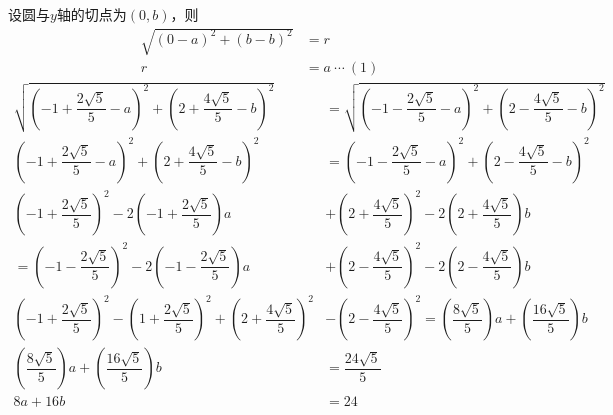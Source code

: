 \documentclass[10pt]{article}
\begin{document}
\begin{enumerate}[leftmargin=*]
\begin{enumerate}
                设圆与$y$轴的切点为$(0, b)$，则
                \begin{align*}
                  \sqrt{(0 - a)^{2} + (b - b)^{2}} & = r              \\
                  r                                & = a\ \cdots\ (1)
                \end{align*}
                \begin{align*}
                  \sqrt{\left(-1 + \dfrac{2\sqrt{5}}{5} - a\right)^{2} + \left(2 + \dfrac{4\sqrt{5}}{5} - b\right)^{2}}                              & = \sqrt{\left(-1 - \dfrac{2\sqrt{5}}{5} - a\right)^{2} + \left(2 - \dfrac{4\sqrt{5}}{5} - b\right)^{2}}                \\
                  \left(-1 + \dfrac{2\sqrt{5}}{5} - a\right)^{2} + \left(2 + \dfrac{4\sqrt{5}}{5} - b\right)^{2}                                     & = \left(-1 - \dfrac{2\sqrt{5}}{5} - a\right)^{2} + \left(2 - \dfrac{4\sqrt{5}}{5} - b\right)^{2}                       \\
                  \left(-1 + \dfrac{2\sqrt{5}}{5}\right)^{2} - 2\left(-1 + \dfrac{2\sqrt{5}}{5}\right)a                                              & + \left(2 + \dfrac{4\sqrt{5}}{5}\right)^{2} - 2\left(2 + \dfrac{4\sqrt{5}}{5}\right)b                                  \\
                  = \left(-1 - \dfrac{2\sqrt{5}}{5}\right)^{2} - 2\left(-1 - \dfrac{2\sqrt{5}}{5}\right)a                                            & + \left(2 - \dfrac{4\sqrt{5}}{5}\right)^{2} - 2\left(2 - \dfrac{4\sqrt{5}}{5}\right)b                                  \\
                  \left(-1 + \dfrac{2\sqrt{5}}{5}\right)^{2} - \left(1 + \dfrac{2\sqrt{5}}{5}\right)^{2} + \left(2 + \dfrac{4\sqrt{5}}{5}\right)^{2} & - \left(2 - \dfrac{4\sqrt{5}}{5}\right)^{2} = \left(\dfrac{8\sqrt{5}}{5}\right)a + \left(\dfrac{16\sqrt{5}}{5}\right)b \\
                  \left(\dfrac{8\sqrt{5}}{5}\right)a + \left(\dfrac{16\sqrt{5}}{5}\right)b                                                           & = \dfrac{24\sqrt{5}}{5}                                                                                                \\
                  8a + 16b                                                                                                                           & = 24                                                                                                                   \\

\end{align*}
\end{enumerate}
\end{enumerate}
\end{document}

